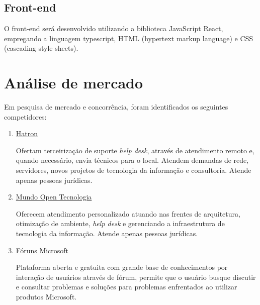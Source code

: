 \documentclass[
    12pt,               %
    openright,          %
    oneside,
    a4paper,            %
    MODELO,             %
    english,            %
    brazil              %
   ]{ifsp-spo-inf-ctds}
\begin{document}
\section{Front-end}

O front-end será desenvolvido utilizando a biblioteca JavaScript React, empregando a linguagem typescript, HTML (hypertext markup language) e CSS (cascading style sheets).
	
\chapter[Análise de mercado]{Análise de mercado}

    Em pesquisa de mercado e concorrência, foram identificados os seguintes competidores:
    
    \begin{enumerate}
        \item \href{https://hatron.com.br/}{Hatron}
        
        Ofertam terceirização de suporte \textit{help desk}, através de atendimento remoto e, quando necessário, envia técnicos para o local. Atendem demandas de rede, servidores, novos projetos de tecnologia da informação e consultoria. Atende apenas pessoas jurídicas.
        
        \item \href{https://www.mundoopen.com.br/helpdesk-para-empresas-sp-suporte-tecnico-em-ti.html}{Mundo Open Tecnologia}
        
        Oferecem atendimento personalizado atuando nas frentes de arquitetura, otimização de ambiente, \textit{help desk} e gerenciando a infraestrutura de tecnologia da informação. Atende apenas pessoas jurídicas.
        
        \item \href{https://answers.microsoft.com/pt-br?auth=1}{Fóruns Microsoft}
        
        Plataforma aberta e gratuita com grande base de conhecimentos por interação de usuários através de fórum, permite que o usuário busque discutir e consultar problemas e soluções para problemas enfrentados ao utilizar produtos Microsoft.
        
    \end{enumerate}
\end{document}
